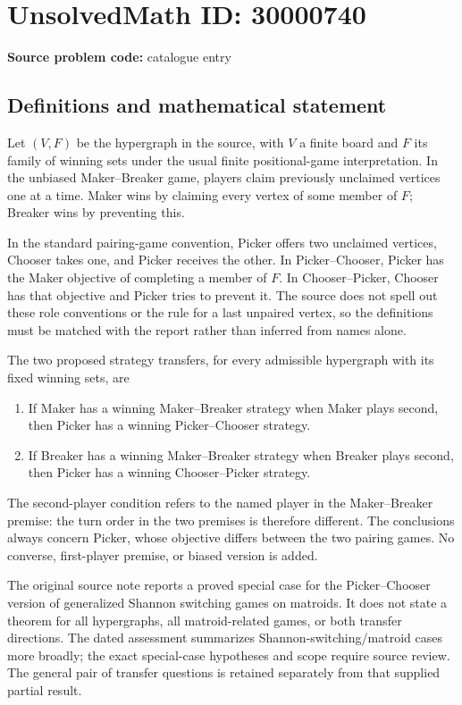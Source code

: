 \documentclass[11pt]{article}
\begin{document}
\section*{UnsolvedMath ID: 30000740}
\textbf{Source problem code:} catalogue entry
\subsection{Definitions and mathematical statement}
Let $(V,F)$ be the hypergraph in the source, with $V$ a finite board and $F$ its family of winning sets under the usual finite positional-game interpretation. In the unbiased Maker--Breaker game, players claim previously unclaimed vertices one at a time. Maker wins by claiming every vertex of some member of $F$; Breaker wins by preventing this.

In the standard pairing-game convention, Picker offers two unclaimed vertices, Chooser takes one, and Picker receives the other. In Picker--Chooser, Picker has the Maker objective of completing a member of $F$. In Chooser--Picker, Chooser has that objective and Picker tries to prevent it. The source does not spell out these role conventions or the rule for a last unpaired vertex, so the definitions must be matched with the report rather than inferred from names alone.

The two proposed strategy transfers, for every admissible hypergraph with its fixed winning sets, are
\begin{enumerate}
\item If Maker has a winning Maker--Breaker strategy when Maker plays second, then Picker has a winning Picker--Chooser strategy.
\item If Breaker has a winning Maker--Breaker strategy when Breaker plays second, then Picker has a winning Chooser--Picker strategy.
\end{enumerate}
The second-player condition refers to the named player in the Maker--Breaker premise: the turn order in the two premises is therefore different. The conclusions always concern Picker, whose objective differs between the two pairing games. No converse, first-player premise, or biased version is added.

The original source note reports a proved special case for the Picker--Chooser version of generalized Shannon switching games on matroids. It does not state a theorem for all hypergraphs, all matroid-related games, or both transfer directions. The dated assessment summarizes Shannon-switching/matroid cases more broadly; the exact special-case hypotheses and scope require source review. The general pair of transfer questions is retained separately from that supplied partial result.
\end{document}
